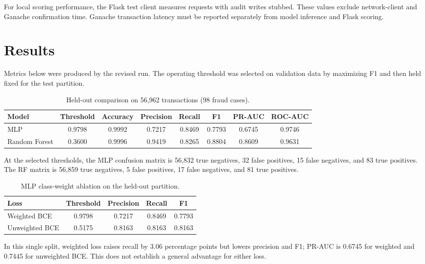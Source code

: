 \documentclass[conference]{IEEEtran}
\begin{document}
For local scoring performance, the Flask test client measures requests with audit writes stubbed. These values exclude network-client and Ganache confirmation time. Ganache transaction latency must be reported separately from model inference and Flask scoring.

\section{Results}
Metrics below were produced by the revised run. The operating threshold was selected on validation data by maximizing F1 and then held fixed for the test partition.

\begin{table}[htbp]
\caption{Held-out comparison on 56,962 transactions (98 fraud cases).}
\centering
\begin{tabular}{lccccccc}
\toprule
Model & Threshold & Accuracy & Precision & Recall & F1 & PR-AUC & ROC-AUC \\
\midrule
MLP & 0.9798 & 0.9992 & 0.7217 & 0.8469 & 0.7793 & 0.6745 & 0.9746 \\
Random Forest & 0.3600 & 0.9996 & 0.9419 & 0.8265 & 0.8804 & 0.8609 & 0.9631 \\
\bottomrule
\end{tabular}
\end{table}

At the selected thresholds, the MLP confusion matrix is 56,832 true negatives, 32 false positives, 15 false negatives, and 83 true positives. The RF matrix is 56,859 true negatives, 5 false positives, 17 false negatives, and 81 true positives.

\begin{table}[htbp]
\caption{MLP class-weight ablation on the held-out partition.}
\centering
\begin{tabular}{lcccc}
\toprule
Loss & Threshold & Precision & Recall & F1 \\
\midrule
Weighted BCE & 0.9798 & 0.7217 & 0.8469 & 0.7793 \\
Unweighted BCE & 0.5175 & 0.8163 & 0.8163 & 0.8163 \\
\bottomrule
\end{tabular}
\end{table}

In this single split, weighted loss raises recall by 3.06 percentage points but lowers precision and F1; PR-AUC is 0.6745 for weighted and 0.7445 for unweighted BCE. This does not establish a general advantage for either loss.
\end{document}
